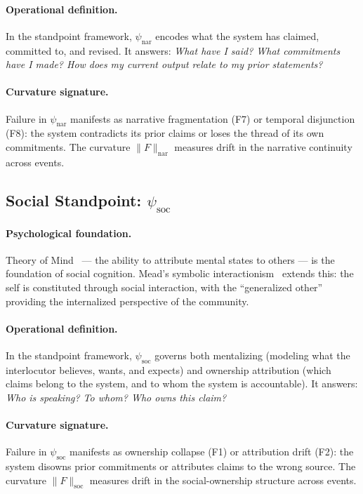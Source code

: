 \paragraph{Operational definition.}
In the standpoint framework, $\psi_{\mathrm{nar}}$ encodes what the system has claimed,
committed to, and revised. It answers: \emph{What have I said? What commitments have I
made? How does my current output relate to my prior statements?}

\paragraph{Curvature signature.}
Failure in $\psi_{\mathrm{nar}}$ manifests as narrative fragmentation (F7) or temporal
disjunction (F8): the system contradicts its prior claims or loses the thread of its
own commitments. The curvature $\|F\|_{\mathrm{nar}}$ measures drift in the narrative
continuity across events.

\subsection{Social Standpoint: $\psi_{\mathrm{soc}}$}
\label{sec:psi-soc}

\paragraph{Psychological foundation.}
Theory of Mind~\cite{premack1978does} --- the ability to attribute mental states to
others --- is the foundation of social cognition. Mead's symbolic
interactionism~\cite{mead1934mind} extends this: the self is constituted through social
interaction, with the ``generalized other'' providing the internalized perspective of the
community.

\paragraph{Operational definition.}
In the standpoint framework, $\psi_{\mathrm{soc}}$ governs both mentalizing (modeling
what the interlocutor believes, wants, and expects) and ownership attribution (which
claims belong to the system, and to whom the system is accountable). It answers:
\emph{Who is speaking? To whom? Who owns this claim?}

\paragraph{Curvature signature.}
Failure in $\psi_{\mathrm{soc}}$ manifests as ownership collapse (F1) or attribution
drift (F2): the system disowns prior commitments or attributes claims to the wrong
source. The curvature $\|F\|_{\mathrm{soc}}$ measures drift in the social-ownership
structure across events.

